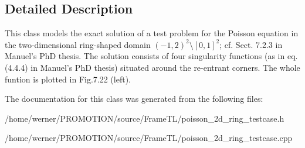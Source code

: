 \subsection{Detailed Description}
This class models the exact solution of a test problem for the Poisson equation in the two-dimensional ring-shaped domain $(-1,2)^2\setminus [0,1]^2$; cf. Sect. 7.2.3 in Manuel's PhD thesis. The solution consists of four singularity functions (as in eq. (4.4.4) in Manuel's PhD thesis) situated around the re-entrant corners. The whole funtion is plotted in Fig.7.22 (left). 

The documentation for this class was generated from the following files:\begin{CompactItemize}
\item 
/home/werner/PROMOTION/source/FrameTL/poisson\_\-2d\_\-ring\_\-testcase.h\item 
/home/werner/PROMOTION/source/FrameTL/poisson\_\-2d\_\-ring\_\-testcase.cpp\end{CompactItemize}
